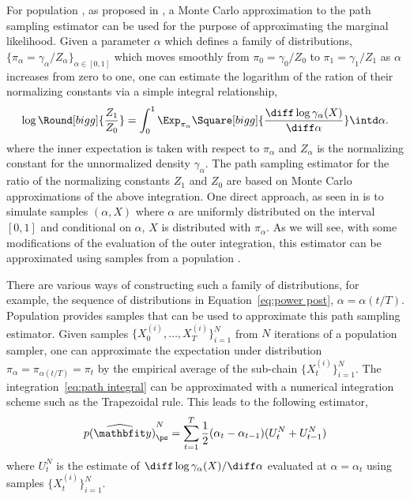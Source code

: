 For population \mcmc, as proposed in \cite{Calderhead:2009bd}, a Monte Carlo
approximation to the path sampling estimator \cite{Gelman:1998ei} can be used
for the purpose of approximating the marginal likelihood. Given a parameter
$\alpha$ which defines a family of distributions, $\{\pi_{\alpha} =
\gamma_{\alpha}/Z_{\alpha}\}_{\alpha\in[0,1]}$ which moves smoothly from
$\pi_0 = \gamma_0/Z_0$ to $\pi_1 = \gamma_1/Z_1$ as $\alpha$ increases from
zero to one, one can estimate the logarithm of the ration of their
normalizing constants via a simple integral relationship,
\begin{equation}
  \log\Round[bigg]{\frac{Z_1}{Z_0}} = \int_0^1\Exp_{\pi_{\alpha}}
  \Square[bigg]{\frac{\diff\log\gamma_{\alpha}(X)}{\diff\alpha}}
  \intd\alpha.
  \label{eq:path integral}
\end{equation}
where the inner expectation is taken with respect to $\pi_{\alpha}$ and
$Z_{\alpha}$ is the normalizing constant for the unnormalized density
$\gamma_{\alpha}$. The path sampling estimator for the ratio of the
normalizing constants $Z_1$ and $Z_0$ are based on Monte Carlo approximations
of the above integration. One direct approach, as seen in \cite{Gelman:1998ei}
is to simulate samples $(\alpha,X)$ where $\alpha$ are uniformly distributed
on the interval $[0,1]$ and conditional on $\alpha$, $X$ is distributed with
$\pi_{\alpha}$. As we will see, with some modifications of the evaluation of
the outer integration, this estimator can be approximated using samples from
a population \mcmc.

There are various ways of constructing such a family of distributions, for
example, the sequence of distributions in Equation~\eqref{eq:power post},
$\alpha = \alpha(t/T)$. Population \mcmc provides samples that can be used
to approximate this path sampling estimator. Given samples
$\{X_0^{(i)},\dots,X_T^{(i)}\}_{i=1}^N$ from $N$ iterations of a population
\mcmc sampler, one can approximate the expectation under distribution
$\pi_{\alpha} = \pi_{\alpha(t/T)} = \pi_t$ by the empirical average of the
sub-chain $\{X_t^{(i)}\}_{i=1}^N$. The integration~\eqref{eq:path integral}
can be approximated with a numerical integration scheme such as the
Trapezoidal rule. This leads to the following estimator,
\begin{equation}
  \widehat{p(\data)}_{\ps}^N = \sum_{t=1}^T
  \frac{1}{2}(\alpha_t - \alpha_{t-1})(U_t^N + U_{t-1}^N)
\end{equation}
where $U_t^N$ is the estimate of
$\diff\log\gamma_{\alpha}(X)/\diff\alpha$ evaluated at $\alpha = \alpha_t$
using samples $\{X_t^{(i)}\}_{i=1}^N$.

